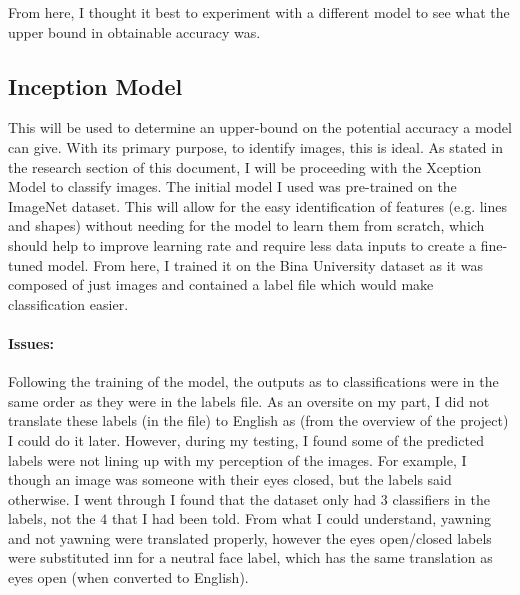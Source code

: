 From here, I thought it best to experiment with a different model to see what the upper bound in obtainable accuracy was.

\subsection{Inception Model}
This will be used to determine an upper-bound on the potential accuracy a model can give. With its primary purpose, to identify images, this is ideal.
As stated in the research section of this document, I will be proceeding with the Xception Model to classify images. The initial model I used was
pre-trained on the ImageNet dataset. This will allow for the easy identification of features (e.g. lines and shapes) without needing for the model to
learn them from scratch, which should help to improve learning rate and require less data inputs to create a fine-tuned model.
From here, I trained it on the Bina University \cite{BINA} dataset as it was composed of just images and contained a label file which would make
classification easier.

\paragraph{Issues:}
Following the training of the model, the outputs as to classifications were in the same order as they were in the labels file. As an
oversite on my part, I did not translate these labels (in the file) to English as (from the overview of the project) I could do it later.
However, during my testing, I found some of the predicted labels were not lining up with my perception of the images. For example, I
though an image was someone with their eyes closed, but the labels said otherwise. I went through I found that the dataset only had 3
classifiers in the labels, not the $4$ that I had been told. From what I could understand, yawning and not yawning were translated properly,
however the eyes open/closed labels were substituted inn for a neutral face label, which has the same translation as eyes open (when
converted to English).

